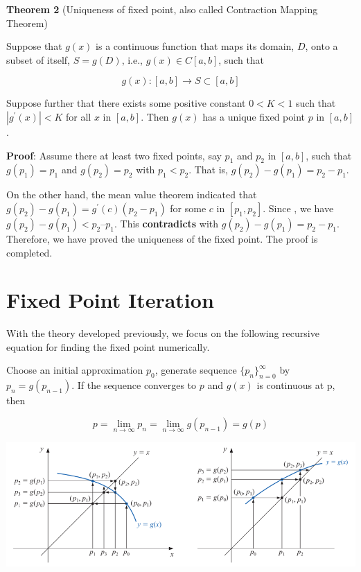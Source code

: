 \documentclass[
]{book}
\begin{document}
\hfill\break

\textbf{Theorem 2} (Uniqueness of fixed point, also called Contraction Mapping Theorem)

Suppose that \(g(x)\) is a continuous function that maps its domain, \(D\), onto a subset of itself, \(S = g(D)\), i.e., \(g(x) \in C[a, b]\), such that

\[
g(x): [a,b]\to S \subset [a, b]
\]

Suppose further that there exists some positive constant \(0 < K < 1\) such that \(|g^\prime(x)| < K\) for all \(x\) in \([a, b]\). Then \(g(x)\) has a unique fixed point \(p\) in \([a, b]\).

\textbf{Proof}: Assume there at least two fixed points, say \(p_1\) and \(p_2\) in \([a,b]\), such that \(g(p_1) = p_1\) and \(g(p_2) = p_2\) with \(p_1 < p_2\). That is, \(g(p_2) - g(p_1) = p_2 - p_1\).

On the other hand, the mean value theorem indicated that \(g(p_2) - g(p_1) = g^\prime (c)(p_2 - p_1)\) for some \(c\) in \([p_1, p_2]\). Since , we have \(g(p_2) - g(p_1) < p_2 – p_1\). This \textbf{contradicts} with \(g(p_2) - g(p_1) = p_2 - p_1\). Therefore, we have proved the uniqueness of the fixed point. The proof is completed.

\hfill\break

\hypertarget{fixed-point-iteration}{%
\section{Fixed Point Iteration}\label{fixed-point-iteration}}

With the theory developed previously, we focus on the following recursive equation for finding the fixed point numerically.

Choose an initial approximation \(p_0\), generate sequence \(\{p_n\}_{n=0}^\infty\) by \(p_n = g(p_{n-1})\). If the sequence converges to \(p\) and \(g(x)\) is continuous at p, then

\[
p = \lim_{n \to \infty}p_n = \lim_{n \to \infty}g(p_{n-1}) = g(p)
\]

\begin{center}\includegraphics[width=0.8\linewidth]{img03/w03-FixedPointIteration} \end{center}
\end{document}
